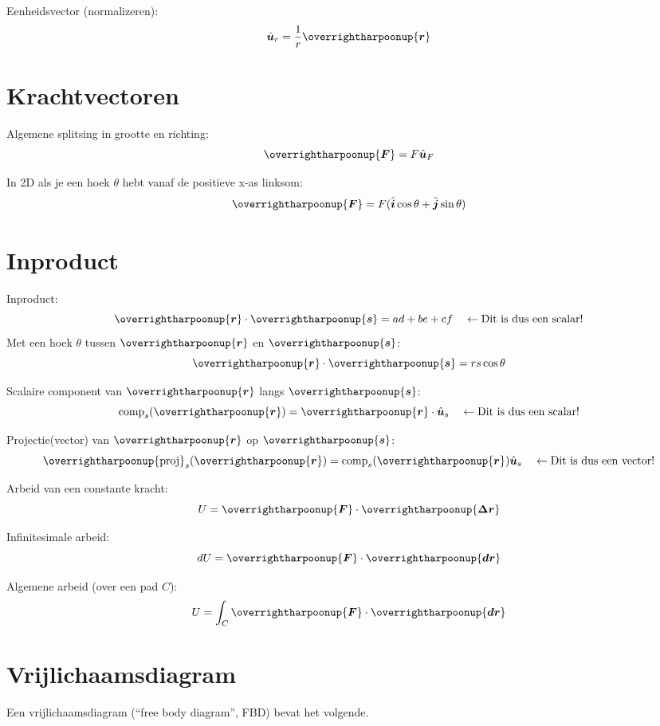 \documentclass{article}
\renewcommand{\v}[1]{\overrightharpoonup{\bm{#1}}}
\renewcommand{\u}[1]{\hat{\bm{#1}}}
\begin{document}
Eenheidsvector (normalizeren):
$$\u{u}_r = \frac{1}{r}\v{r}$$

\section{Krachtvectoren}

Algemene splitsing in grootte en richting:
$$\v{F}=F\u{u}_F$$

In 2D als je een hoek $\theta$ hebt vanaf de positieve x-as linksom:
$$\v{F}=F(\u{i}\cos\theta +\u{j}\sin\theta)$$

\section{Inproduct}
Inproduct:
$$ \v{r} \cdot \v{s}= ad+be+cf \quad\leftarrow\text{Dit is dus een scalar!}$$
Met een hoek $\theta$ tussen $\v{r}$ en $\v{s}$:
$$ \v{r} \cdot \v{s}= rs\cos\theta $$

Scalaire component van $\v{r}$ langs $\v{s}$:
$$\text{comp} _s(\v{r})=\v{r}\cdot\u{u}_s\quad\leftarrow\text{Dit is dus een scalar!}$$

Projectie(vector) van $\v{r}$ op $\v{s}$:
$$\v{\text{proj}} _s(\v{r})=\text{comp} _s(\v{r})\u{u}_s\quad\leftarrow\text{Dit is dus een vector!}$$

Arbeid van een constante kracht:
$$U = \v{F}\cdot \v{\Delta r}$$

Infinitesimale arbeid:
$$dU = \v{F}\cdot\v{d r} $$

Algemene arbeid (over een pad $C$):
$$U=\int_C\v{F}\cdot\v{d r}$$

\section{Vrijlichaamsdiagram}
Een vrijlichaamsdiagram (``free body diagram'', FBD) bevat het volgende.
\end{document}
